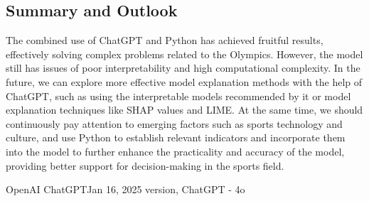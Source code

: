 \documentclass{mcmthesis}  %
\begin{document}
\subsection{Summary and Outlook}
The combined use of ChatGPT and Python has achieved fruitful results, effectively solving complex problems related to the Olympics. However, the model still has issues of poor interpretability and high computational complexity. In the future, we can explore more effective model explanation methods with the help of ChatGPT, such as using the interpretable models recommended by it or model explanation techniques like SHAP values and LIME. At the same time, we should continuously pay attention to emerging factors such as sports technology and culture, and use Python to establish relevant indicators and incorporate them into the model to further enhance the practicality and accuracy of the model, providing better support for decision-making in the sports field.
\begin{aitool}{OpenAI ChatGPT}{Jan 16, 2025 version, ChatGPT - 4o}
\begin{queryoutput}
\end{queryoutput}
\end{aitool}
\end{document}
